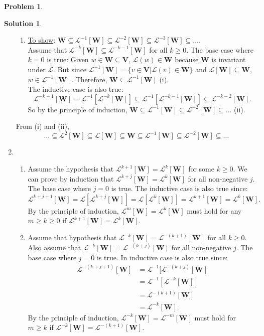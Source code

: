 \documentclass{book}
\theoremstyle{definition}
\newtheorem*{prob*}{Problem}
\newtheorem*{sln*}{Solution}
\newcommand{\V}{\mathbf{V}}
\newcommand{\W}{\mathbf{W}}
\newcommand{\lag}{\mathcal{L}}
\begin{document}
\begin{prob*}
\begin{sln*}
\begin{enumerate}
\begin{enumerate}
				\item \underline{To show}: $\W \subseteq \lag^{-1}[\W] \subseteq \lag^{-2}[\W] \subseteq \lag^{-3}[\W]\subseteq\dots$.\\
				
				Assume that $\lag^{-k}[\W] \subseteq \lag^{-k-1}[\W] $ for all $k\geq 0$. The base case where $k=0$ is true: Given $w\in\W\subseteq \V$, $\lag(w) \in \W$ because $\W$ is invariant under $\lag$. But since $\lag^{-1}[\W] = \{ v\in\V \vert \lag(v)\in \W\}$ and $\lag[\W]\subseteq \W$, $w \in \lag^{-1}[\W]$. Therefore, $\W \subseteq \lag^{-1}[\W]$ (i).\\
				
				The inductive case is also true: $$ \lag^{-k-1}[\W] = \lag^{-1}[\lag^{-k}[\W]] \subseteq \lag^{-1}[\lag^{-k-1}[\W]] \subseteq \lag^{-k-2}[\W].  $$ So by the principle of induction, $\W \subseteq \lag^{-1}[\W] \subseteq \lag^{-2}[\W] \subseteq\dots$ (ii). \\
			\end{enumerate}
				
			From (i) and (ii), $$ \dots  \subseteq \lag^2[\W]\subseteq \lag [\W] \subseteq \W \subseteq \lag^{-1}[\W] \subseteq \lag^{-2}[\W] \subseteq\dots $$
				
				
				
			\item 
			\begin{enumerate}
				\item Assume the hypothesis that $\lag^{k+1}[\W] = \lag^k[\W]$ for some $k\geq 0$. We can prove by induction that $\lag^{k+j}[\W] = \lag^k[\W]$ for all non-negative $j$. The base case where $j=0$ is true. The inductive case is also true since: $$ \lag^{k+j+1}[\W] =  \lag[\lag^{k+j}[\W]] = \lag[\lag^k[\W]] = \lag^{k+1}[\W] = \lag^k[\W]. $$ By the principle of induction, $\lag^{m}[\W] = \lag^k[\W]$ must hold for any $m\geq k\geq 0$ if $\lag^{k+1}[\W] = \lag^k[\W]$.\\
				
				\item Assume that hypothesis that $\lag^{-k}[\W] = \lag^{-(k+1)}[\W]$ for all $k \geq 0$. Also assume that $\lag^{-k}[\W] = \lag^{-(k+j)}[\W]$ for all non-negative $j$. The base case where $j=0$ is true. In inductive case is also true since: 
				 \begin{align*}
				 				 \lag^{-(k+j+1)}[\W] &= \lag^{-1}[\lag^{-(k+j)}[\W]\\ &=  \lag^{-1}[\lag^{-k}[\W]]\\ &= \lag^{-(k+1)}[\W]\\ &= \lag^{-k}[\W].
				 \end{align*}
 				By the principle of induction, $\lag^{-k}[\W] = \lag^{-m}[\W]$ must hold for $m\geq k$ if $\lag^{-k}[\W] = \lag^{-(k+1)}[\W]$.\\
				

\end{enumerate}
\end{enumerate}
\end{sln*}
\end{prob*}
\end{document}
